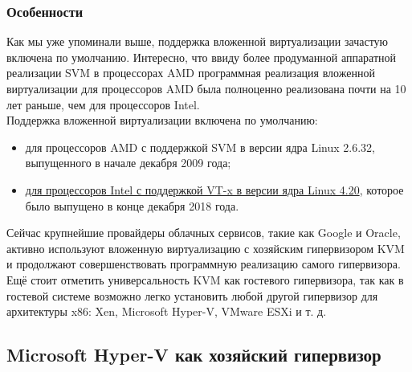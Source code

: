 \documentclass[14pt, a4paper]{article}
\begin{document}
\subsubsection*{Особенности}

Как мы уже упоминали выше, поддержка вложенной виртуализации зачастую включена по
умолчанию. Интересно, что ввиду более продуманной аппаратной реализации SVM в процессорах
AMD программная реализация вложенной виртуализации для процессоров AMD была полноценно
реализована почти на 10 лет раньше, чем для процессоров Intel.\\

Поддержка вложенной виртуализации включена по умолчанию:
\begin{itemize}
    \item для процессоров AMD с поддержкой SVM в версии ядра Linux 2.6.32, выпущенного в начале
    декабря 2009 года;
    \item \href{https://git.kernel.org/pub/scm/linux/kernel/git/torvalds/linux.git/commit/?id=1e58e5e59148916fa43444a406335a990783fb78}{для процессоров Intel с поддержкой VT-x в версии ядра Linux 4.20}, которое было выпущено в
    конце декабря 2018 года.
\end{itemize}

Сейчас крупнейшие провайдеры облачных сервисов, такие как Google и Oracle, активно используют
вложенную виртуализацию с хозяйским гипервизором KVM и продолжают совершенствовать
программную реализацию самого гипервизора.\\

Ещё стоит отметить универсальность KVM как гостевого гипервизора, так как в гостевой системе
возможно легко установить любой другой гипервизор для архитектуры x86: Xen, Microsoft Hyper-V,
VMware ESXi и т. д.\\

\newpage

\subsection*{Microsoft Hyper-V как хозяйский гипервизор}

\begin{figure}[h]
    \centering
    \\  \mbox{}\\
    \label{framework} 
\end{figure}
\end{document}
